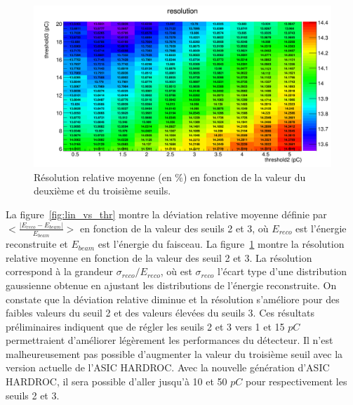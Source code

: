 \begin{figure}[!ht]
  \begin{center}
    \includegraphics[width=1.\textwidth]{SDHCAL/figs/cumulResol.png}
    \caption{Résolution relative moyenne (en $\%$) en fonction de la valeur du deuxième et du troisième seuils.}
    \label{fig:res_vs_thr}
  \end{center}
\end{figure}
La figure~\ref{fig:lin_vs_thr} montre la déviation relative moyenne définie par $\big<\frac{|E_{reco}-E_{beam}|}{E_{beam}}\big>$ en fonction de la valeur des seuils 2 et 3, où $E_{reco}$ est l'énergie reconstruite et $E_{beam}$ est l'énergie du faisceau. La figure~\ref{fig:res_vs_thr} montre la résolution relative moyenne en fonction de la valeur des seuil 2 et 3. La résolution correspond à la grandeur $\sigma_{reco}/E_{reco}$, où est $\sigma_{reco}$ l'écart type d'une distribution gaussienne obtenue en ajustant les distributions de l'énergie reconstruite. On constate que la déviation relative diminue et la résolution s'améliore pour des faibles valeurs du seuil 2 et des valeurs élevées du seuils 3. Ces résultats préliminaires indiquent que de régler les seuils 2 et 3 vers 1 et 15 $pC$ permettraient d'améliorer légèrement les performances du détecteur. Il n'est malheureusement pas possible d'augmenter la valeur du troisième seuil avec la version actuelle de l'ASIC HARDROC. Avec la nouvelle génération d'ASIC HARDROC, il sera possible d'aller jusqu'à 10 et 50 $pC$ pour respectivement les seuils 2 et 3. 

